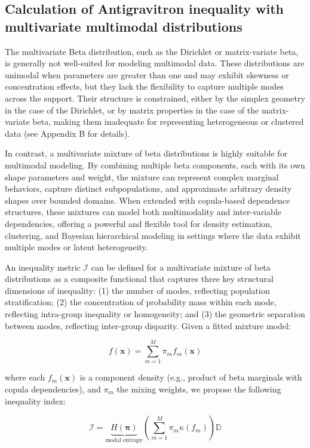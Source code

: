 \documentclass[11pt]{article}
\begin{document}
\subsection{Calculation of Antigravitron inequality with multivariate multimodal distributions}

The multivariate Beta distribution, such as the Dirichlet or matrix-variate beta, is generally not well-suited for modeling multimodal data. These distributions are unimodal when parameters are greater than one and may exhibit skewness or concentration effects, but they lack the flexibility to capture multiple modes across the support. Their structure is constrained, either by the simplex geometry in the case of the Dirichlet, or by matrix properties in the case of the matrix-variate beta, making them inadequate for representing heterogeneous or clustered data (see Appendix B for details).

In contrast, a multivariate mixture of beta distributions is highly suitable for multimodal modeling. By combining multiple beta components, each with its own shape parameters and weight, the mixture can represent complex marginal behaviors, capture distinct subpopulations, and approximate arbitrary density shapes over bounded domains. When extended with copula-based dependence structures, these mixtures can model both multimodality and inter-variable dependencies, offering a powerful and flexible tool for density estimation, clustering, and Bayesian hierarchical modeling in settings where the data exhibit multiple modes or latent heterogeneity.

An inequality metric $\mathcal{I}$ can be defined for a multivariate mixture of beta distributions as a composite functional that captures three key structural dimensions of inequality: (1) the number of modes, reflecting population stratification; (2) the concentration of probability mass within each mode, reflecting intra-group inequality or homogeneity; and (3) the geometric separation between modes, reflecting inter-group disparity. Given a fitted mixture model:

\[
f(\mathbf{x}) = \sum_{m=1}^{M} \pi_m f_m(\mathbf{x})
\]

where each $f_m(\mathbf{x})$ is a component density (e.g., product of beta marginals with copula dependencies), and $\pi_m$ the mixing weights, we propose the following inequality index:

\[
\mathcal{I} = \underbrace{H(\boldsymbol{\pi})}_{\text{modal entropy}} \left( \sum_{m=1}^{M} \pi_m  \kappa(f_m) \right) \mathbb{D}
\]
\end{document}
